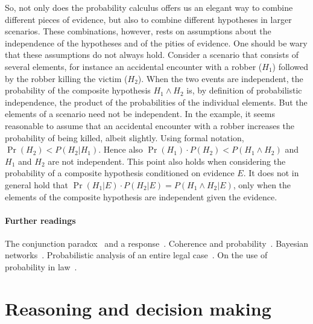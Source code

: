 \documentclass[10pt]{article}
\begin{document}
\noindent So, not only does the probability calculus offers us an elegant way to combine different pieces of evidence, but also to combine 
different hypotheses in larger scenarios.
These combinations, however, rests on assumptions about the independence of the hypotheses and of the pities of evidence. 
One should be wary that these assumptions do not always hold. Consider a scenario that consists of several elements, for instance an accidental 
encounter with a robber ($H_1$) followed by the robber killing the victim ($H_2$). When the two events are independent, the probability of the composite hypothesis $H_1 \land H_2$ is, by definition of probabilistic independence, 
the product of the probabilities of the individual elements. But the elements of a scenario need not be 
independent. In the example, it seems reasonable to assume that an accidental encounter with a robber increases the probability of being killed, albeit slightly. Using formal notation, $\Pr(H_2) < P(H_2 | H_1)$. Hence also $\Pr(H_1) \cdot P(H_2) < P(H_1 \land H_2)$ and $H_1$ and $H_2$ are not independent. This point also holds when considering the probability of a composite hypothesis conditioned on evidence $E$. It does not in general hold that $\Pr(H_1 | E) \cdot P(H_2 | E) = P(H_1 \land H_2 | E)$, only when the elements of the composite hypothesis are independent given the evidence.


\paragraph{Further readings}
The conjunction paradox~\citep{cohen1977} and a response~\citep{dawid1987}. 
Coherence and probability~\citep{bovensHartman2003}.
Bayesian networks~\citep{taroniEtal2006}. Probabilistic 
analysis of an entire legal case~\citep{kadaneSchum1996}.
On the use of probability in law~\citep{fenton2011}.






\section{Reasoning and decision making}
\label{sec:whenconv}
\label{sec:intexc}

\end{document}
